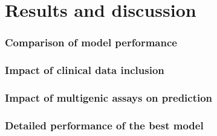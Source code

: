 \section{Results and discussion}


\begin{frame}
    \frametitle{Comparison of model performance}
    \vspace{3mm}



    \vfill 
\end{frame}


\begin{frame}
    \frametitle{Impact of clinical data inclusion}
    \vspace{3mm}



    \vfill 
\end{frame}


\begin{frame}
    \frametitle{Impact of multigenic assays on prediction}
    \vspace{3mm}



    \vfill 
\end{frame}



\begin{frame}
    \frametitle{Detailed performance of the best model}
    \vspace{3mm}



    \vfill 
\end{frame}